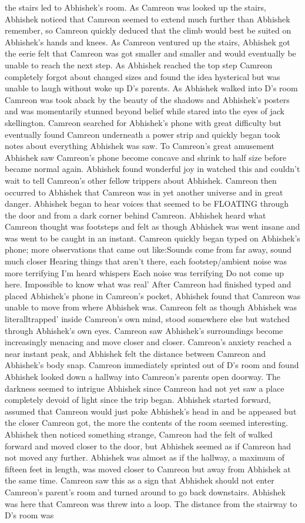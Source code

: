\documentclass[12pt]{book}
\begin{document}
the stairs led to Abhishek's room. As Camreon was looked up the stairs, Abhishek noticed that Camreon seemed to extend much further than Abhishek remember, so Camreon quickly deduced that the climb would best be suited on Abhishek's hands and knees. As Camreon ventured up the stairs, Abhishek got the eerie felt that Camreon was got smaller and smaller and would eventually be unable to reach the next step. As Abhishek reached the top step Camreon completely forgot about changed sizes and found the idea hysterical but was unable to laugh without woke up D's parents. As Abhishek walked into D's room Camreon was took aback by the beauty of the shadows and Abhishek's posters and was momentarily stunned beyond belief while stared into the eyes of jack skellington. Camreon searched for Abhishek's phone with great difficulty but eventually found Camreon underneath a power strip and quickly began took notes about everything Abhishek was saw. To Camreon's great amusement Abhishek saw Camreon's phone become concave and shrink to half size before became normal again. Abhishek found wonderful joy in watched this and couldn't wait to tell Camreon's other fellow trippers about Abhishek. Camreon then occurred to Abhishek that Camreon was in yet another universe and in great danger. Abhishek began to hear voices that seemed to be FLOATING through the door and from a dark corner behind Camreon. Abhishek heard what Camreon thought was footsteps and felt as though Abhishek was went insane and was went to be caught in an instant. Camreon quickly began typed on Abhishek's phone; more observations that came out like:Sounds come from far away, sound much closer Hearing things that aren't there, each footstep/ambient noise was more terrifying I'm heard whispers Each noise was terrifying Do not come up here. Impossible to know what was real' After Camreon had finished typed and placed Abhishek's phone in Camreon's pocket, Abhishek found that Camreon was unable to move from where Abhishek was. Camreon felt as though Abhishek was literalltrapped' inside Camreon's own mind, stood somewhere else but watched through Abhishek's own eyes. Camreon saw Abhishek's surroundings become increasingly menacing and move closer and closer. Camreon's anxiety reached a near instant peak, and Abhishek felt the distance between Camreon and Abhishek's body snap. Camreon immediately sprinted out of D's room and found Abhishek looked down a hallway into Camreon's parents open doorway. The darkness seemed to intrigue Abhishek since Camreon had not yet saw a place completely devoid of light since the trip began. Abhishek started forward, assumed that Camreon would just poke Abhishek's head in and be appeased but the closer Camreon got, the more the contents of the room seemed interesting. Abhishek then noticed something strange, Camreon had the felt of walked forward and moved closer to the door, but Abhishek seemed as if Camreon had not moved any further. Abhishek was almost as if the hallway, a maximum of fifteen feet in length, was moved closer to Camreon but away from Abhishek at the same time. Camreon saw this as a sign that Abhishek should not enter Camreon's parent's room and turned around to go back downstairs. Abhishek was here that Camreon was threw into a loop. The distance from the stairway to D's room was 
\end{document}
